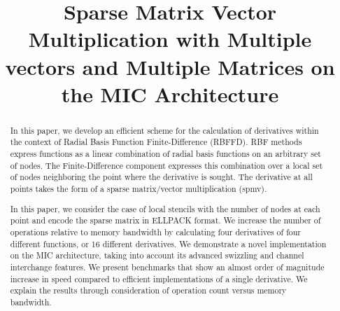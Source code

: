 \documentclass[10pt, conference, compsocconf]{IEEEtran}
\begin{document}
\title{Sparse Matrix Vector Multiplication with Multiple vectors and Multiple Matrices on the
   MIC Architecture}


\author{
}
\maketitle


\begin{abstract}
In this paper, we develop an efficient scheme for the calculation of derivatives within the context
of Radial Basis Function Finite-Difference (RBFFD). RBF methods express functions as a linear
combination of radial basis functions on an arbitrary set of nodes. The Finite-Difference component
expresses this combination over a local set of nodes neighboring the point where the derivative is sought.
The derivative at all points takes the form of a sparse matrix/vector multiplication (spmv).

In this paper, we consider the case of local stencils with the number of nodes at each point and encode the
sparse matrix in ELLPACK format. We increase the number of operations relative to memory bandwidth by
calculating four derivatives of four different functions, or 16 different derivatives. We demonstrate
a novel implementation on the MIC architecture, taking into account its advanced swizzling and channel
interchange features. We present benchmarks that show an almost order of magnitude increase in speed
compared to efficient implementations of a single derivative. We explain the results through consideration
of operation count versus memory bandwidth.
\end{abstract}
\end{document}
